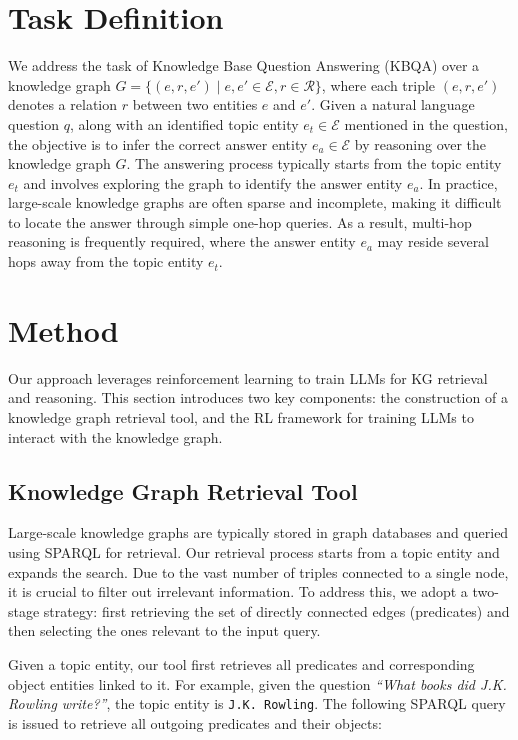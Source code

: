 \documentclass[10pt,conference]{IEEEtran}
\begin{document}
\section{Task Definition}

We address the task of Knowledge Base Question Answering (KBQA) over a knowledge graph $G = \{(e, r, e') \mid e, e' \in \mathcal{E}, r \in \mathcal{R} \}$, where each triple $(e, r, e')$ denotes a relation $r$ between two entities $e$ and $e'$. Given a natural language question $q$, along with an identified topic entity $e_t \in \mathcal{E}$ mentioned in the question, the objective is to infer the correct answer entity $e_a \in \mathcal{E}$ by reasoning over the knowledge graph $G$.
The answering process typically starts from the topic entity $e_t$ and involves exploring the graph to identify the answer entity $e_a$. In practice, large-scale knowledge graphs are often sparse and incomplete, making it difficult to locate the answer through simple one-hop queries. As a result, multi-hop reasoning is frequently required, where the answer entity $e_a$ may reside several hops away from the topic entity $e_t$.

\section{Method}
Our approach leverages reinforcement learning to train LLMs for KG retrieval and reasoning. This section introduces two key components: the construction of a knowledge graph retrieval tool, and the RL framework for training LLMs to interact with the knowledge graph.
 

\subsection{Knowledge Graph Retrieval Tool}

Large-scale knowledge graphs are typically stored in graph databases and queried using SPARQL for retrieval. Our retrieval process starts from a topic entity and expands the search. Due to the vast number of triples connected to a single node, it is crucial to filter out irrelevant information. To address this, we adopt a two-stage strategy: first retrieving the set of directly connected edges (predicates) and then selecting the ones relevant to the input query.

Given a topic entity, our tool first retrieves all predicates and corresponding object entities linked to it. For example, given the question \textit{``What books did J.K. Rowling write?''}, the topic entity is \texttt{J.K. Rowling}. The following SPARQL query is issued to retrieve all outgoing predicates and their objects:
\end{document}
